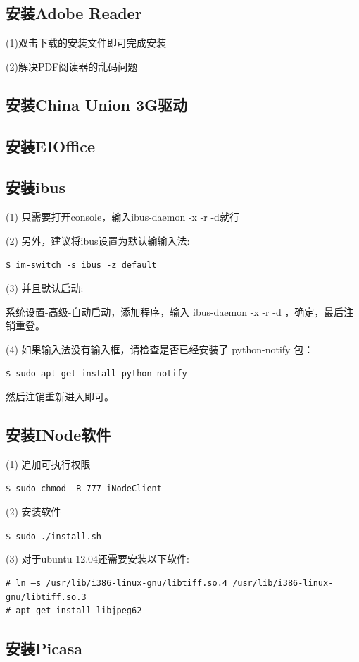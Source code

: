 \subsection{安装Adobe Reader}
(1)双击下载的安装文件即可完成安装

(2)解决PDF阅读器的乱码问题

\subsection{安装China Union 3G驱动}

\subsection{安装EIOffice}

\subsection{安装ibus}
(1) 只需要打开console，输入ibus-daemon -x -r -d就行 

(2) 另外，建议将ibus设置为默认输输入法:

\verb"$ im-switch -s ibus -z default"

(3) 并且默认启动:

系统设置-高级-自动启动，添加程序，输入 ibus-daemon -x -r -d ，确定，最后注销重登。

(4) 如果输入法没有输入框，请检查是否已经安装了 python-notify 包：

\verb"$ sudo apt-get install python-notify"

然后注销重新进入即可。

\subsection {安装INode软件}
(1) 追加可执行权限

\verb"$ sudo chmod –R 777 iNodeClient"

(2) 安装软件

\verb"$ sudo ./install.sh"

(3) 对于ubuntu 12.04还需要安装以下软件:
\begin{verbatim}
# ln –s /usr/lib/i386-linux-gnu/libtiff.so.4 /usr/lib/i386-linux-gnu/libtiff.so.3
# apt-get install libjpeg62
\end{verbatim}

\subsection{安装Picasa}

